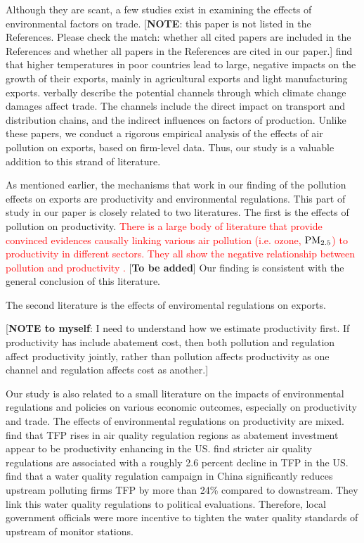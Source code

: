 \documentclass[12pt]{article}
\begin{document}
Although they are scant, a few studies exist in examining the effects of
environmental factors on trade. \cite{jones2010climate} [\textbf{NOTE}: this
paper is not listed in the References. Please check the match: whether all
cited papers are included in the References and whether all papers in the
References are cited in our paper.] find that higher temperatures in poor
countries lead to large, negative impacts on the growth of their exports,
mainly in agricultural exports and light manufacturing exports. \cite%
{dellink2017international} verbally describe the potential channels through
which climate change damages affect trade. The channels include the direct
impact on transport and distribution chains, and the indirect influences on
factors of production. Unlike these papers, we conduct a rigorous empirical
analysis of the effects of air pollution on exports, based on firm-level
data. Thus, our study is a valuable addition to this strand of literature.

As mentioned earlier, the mechanisms that work in our finding of the
pollution effects on exports are productivity and environmental regulations.
This part of study in our paper is closely related to two literatures. The
first is the effects of pollution on productivity. \textcolor{red}{There is a large body of literature that provide convinced evidences causally linking various air pollution (i.e. ozone, $\rm PM_{2.5}$) to productivity in different sectors. They all show the negative relationship between pollution and productivity \citep{graff2012impact,chang2016particulate,fu2021air,adhvaryu2022management}. } [\textbf{To be added}]
Our finding is consistent with the general conclusion of this literature.

The second literature is the effects of enviromental regulations on exports.

[\textbf{NOTE to myself}: I need to understand how we estimate productivity
first. If productivity has include abatement cost, then both pollution and
regulation affect productivity jointly, rather than pollution affects
productivity as one channel and regulation affects cost as another.]

Our study is also related to a small literature on the impacts of
environmental regulations and policies on various economic outcomes,
especially on productivity and trade. The effects of environmental
regulations on productivity are mixed. \cite{berman2001environmental} find
that TFP rises in air quality regulation regions as abatement investment
appear to be productivity enhancing in the US. \cite{NBERw18392}
find stricter air quality regulations are associated with a roughly 2.6
percent decline in TFP in the US. \cite{he2020watering} find that a water
quality regulation campaign in China significantly reduces upstream
polluting firms TFP by more than 24\% compared to downstream. They link this
water quality regulations to political evaluations. Therefore, local
government officials were more incentive to tighten the water quality
standards of upstream of monitor stations.
\end{document}
